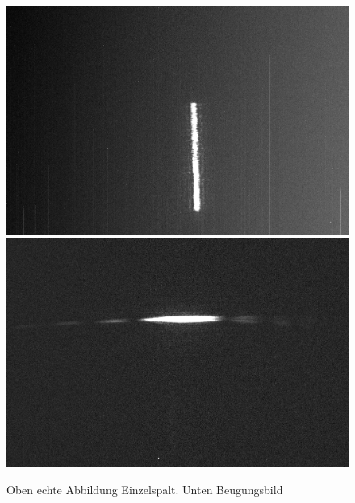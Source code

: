 \newpage
\begin{figure}[h]
	\centering
	\includegraphics[width=\textwidth]{Daten/spalt_1.jpg}
	\includegraphics[width=\textwidth]{Daten/spalt_2.jpg}
	\caption[Aufnahme Einzelspalt]{Oben echte Abbildung Einzelspalt. Unten Beugungsbild}
\end{figure}

